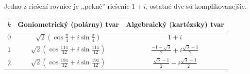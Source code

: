 \begin{priklad}
\begin{center}
\end{center}
Jedno z riešení rovnice je ,,pekné'' riešenie $1+i$, ostatné dve sú komplikovanejšie.
\begin{center}
\begin{tabular}{|c|c|c|}
\hline
$k$ & \textbf{Goniometrický (polárny) tvar} & \textbf{Algebraický (kartézsky) tvar} \\ \hline
$0$ & $\sqrt{2} \left( \cos \frac{\pi}{4} + i \sin \frac{\pi}{4} \right)$ & $1 + i$ \\ \hline
$1$ & $\sqrt{2} \left( \cos \frac{11\pi}{12} + i \sin \frac{11\pi}{12} \right)$  & $\frac{-1-\sqrt{3}}{2} + i \frac{\sqrt{3}-1}{2}$ \\ \hline
$2$ & $\sqrt{2} \left( \cos \frac{19\pi}{12} + i \sin \frac{19\pi}{12} \right)$  & $\frac{\sqrt{3}-1}{2} - i \frac{\sqrt{3}+1}{2}$ \\ \hline
\end{tabular}
\end{center}
\end{priklad}


